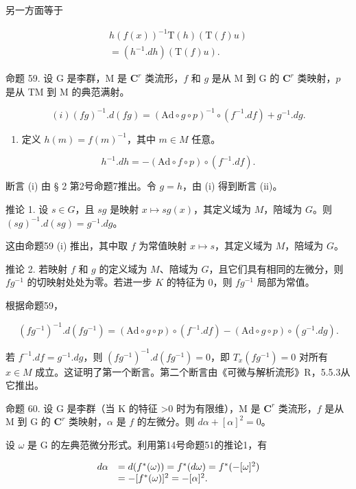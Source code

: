 另一方面等于

\[
\begin{array}{c} h (f (x)) ^ {- 1} \mathrm{T} (h) (\mathrm{T} (f) u) \\ = (h ^ {- 1}. d h) (\mathrm{T} (f) u). \end{array}
\]

命题 59. 设 G 是李群，M 是 \(\mathbf{C}^r\) 类流形，\(f\) 和 \(g\) 是从 M 到 G 的 \(\mathbf{C}^r\) 类映射，\(p\) 是从 TM 到 M 的典范满射。

\[
(i) (f g) ^ {- 1}. d (f g) = (\mathrm{Ad} \circ g \circ p) ^ {- 1} \circ (f ^ {- 1}. d f) + g ^ {- 1}. d g.
\]

\begin{enumerate}
\def\labelenumi{(\roman{enumi})}
\setcounter{enumi}{1}
\tightlist
\item
  定义 \(h(m) = f(m)^{-1}\)，其中 \(m \in M\) 任意。
\end{enumerate}

\[
h ^ {- 1}. d h = - (\mathrm{Ad} \circ f \circ p) \circ (f ^ {- 1}. d f).
\]

断言 (i) 由 § 2 第2号命题7推出。令 \(g = h\)，由 (i) 得到断言 (ii)。

推论 1. 设 \(s \in G\)，且 \(sg\) 是映射 \(x \mapsto sg(x)\)，其定义域为 \(M\)，陪域为 \(G\)。则 \((sg)^{-1}.d(sg) = g^{-1}.dg\)。

这由命题59 (i) 推出，其中取 \(f\) 为常值映射 \(x \mapsto s\)，其定义域为 \(M\)，陪域为 \(G\)。

推论 2. 若映射 \(f\) 和 \(g\) 的定义域为 \(M\)、陪域为 \(G\)，且它们具有相同的左微分，则 \(fg^{-1}\) 的切映射处处为零。若进一步 \(K\) 的特征为 0，则 \(fg^{-1}\) 局部为常值。

根据命题59，

\[
(f g ^ {- 1}) ^ {- 1}. d (f g ^ {- 1}) = (\mathrm{Ad} \circ g \circ p) \circ (f ^ {- 1}. d f) - (\mathrm{Ad} \circ g \circ p) \circ (g ^ {- 1}. d g).
\]

若 \(f^{-1}.df = g^{-1}.dg\)，则 \((fg^{-1})^{-1}.d(fg^{-1}) = 0\)，即 \(T_x(fg^{-1}) = 0\) 对所有 \(x \in M\) 成立。这证明了第一个断言。第二个断言由《可微与解析流形》R，5.5.3从它推出。

命题 60. 设 G 是李群（当 K 的特征 \textgreater0 时为有限维），M 是 \(\mathbf{C}^r\) 类流形，\(f\) 是从 M 到 G 的 \(\mathbf{C}^r\) 类映射，\(\alpha\) 是 \(f\) 的左微分。则 \(d\alpha + [\alpha]^2 = 0\)。

设 \(\omega\) 是 G 的左典范微分形式。利用第14号命题51的推论1，有

\[
\begin{array}{r l} d \alpha & = d (f ^ {*} (\omega)) = f ^ {*} (d \omega) = f ^ {*} (- [ \omega ] ^ {2}) \\ & = - [ f ^ {*} (\omega) ] ^ {2} = - [ \alpha ] ^ {2}. \end{array}
\]

